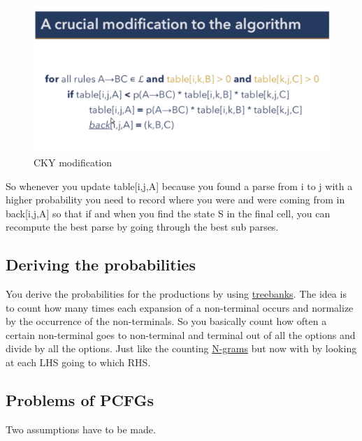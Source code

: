 \documentclass[
  11pt,
  british,
]{article}
\begin{document}
\begin{figure}
\centering
\includegraphics{Pasted_image_20220526203433.png}
\caption{CKY modification}
\end{figure}

So whenever you update table{[}i,j,A{]} because you found a parse from i
to j with a higher probability you need to record where you were and
were coming from in back{[}i,j,A{]} so that if and when you find the
state S in the final cell, you can recompute the best parse by going
through the best sub parses.

\hypertarget{deriving-the-probabilities}{%
\subsection{Deriving the
probabilities}\label{deriving-the-probabilities}}

You derive the probabilities for the productions by using
\href{../Data/Treebank.md}{treebanks}. The idea is to count how many
times each expansion of a non-terminal occurs and normalize by the
occurrence of the non-terminals. So you basically count how often a
certain non-terminal goes to non-terminal and terminal out of all the
options and divide by all the options. Just like the counting
\href{N-grams.md}{N-grams} but now with by looking at each LHS going to
which RHS.

\hypertarget{problems-of-pcfgs}{%
\subsection{Problems of PCFGs}\label{problems-of-pcfgs}}

Two assumptions have to be made.
\end{document}
